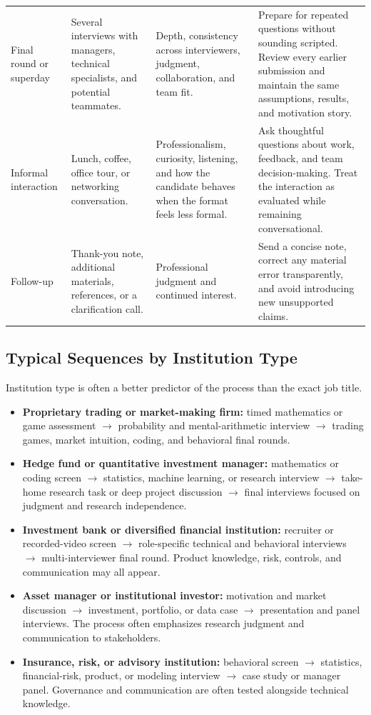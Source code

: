\documentclass[11pt,letterpaper,openany]{book}
\begin{document}
\begin{longtable}{@{}L{0.16\textwidth}L{0.25\textwidth}L{0.25\textwidth}L{0.26\textwidth}@{}}
Final round or superday & Several interviews with managers, technical specialists, and potential teammates. & Depth, consistency across interviewers, judgment, collaboration, and team fit. & Prepare for repeated questions without sounding scripted. Review every earlier submission and maintain the same assumptions, results, and motivation story. \\
Informal interaction & Lunch, coffee, office tour, or networking conversation. & Professionalism, curiosity, listening, and how the candidate behaves when the format feels less formal. & Ask thoughtful questions about work, feedback, and team decision-making. Treat the interaction as evaluated while remaining conversational. \\
Follow-up & Thank-you note, additional materials, references, or a clarification call. & Professional judgment and continued interest. & Send a concise note, correct any material error transparently, and avoid introducing new unsupported claims. \\
\bottomrule
\end{longtable}

\subsection{Typical Sequences by Institution Type}
Institution type is often a better predictor of the process than the exact job title.

\begin{itemize}
  \item \textbf{Proprietary trading or market-making firm:} timed mathematics or game assessment $\rightarrow$ probability and mental-arithmetic interview $\rightarrow$ trading games, market intuition, coding, and behavioral final rounds.
  \item \textbf{Hedge fund or quantitative investment manager:} mathematics or coding screen $\rightarrow$ statistics, machine learning, or research interview $\rightarrow$ take-home research task or deep project discussion $\rightarrow$ final interviews focused on judgment and research independence.
  \item \textbf{Investment bank or diversified financial institution:} recruiter or recorded-video screen $\rightarrow$ role-specific technical and behavioral interviews $\rightarrow$ multi-interviewer final round. Product knowledge, risk, controls, and communication may all appear.
  \item \textbf{Asset manager or institutional investor:} motivation and market discussion $\rightarrow$ investment, portfolio, or data case $\rightarrow$ presentation and panel interviews. The process often emphasizes research judgment and communication to stakeholders.
  \item \textbf{Insurance, risk, or advisory institution:} behavioral screen $\rightarrow$ statistics, financial-risk, product, or modeling interview $\rightarrow$ case study or manager panel. Governance and communication are often tested alongside technical knowledge.
\end{itemize}
\end{document}
